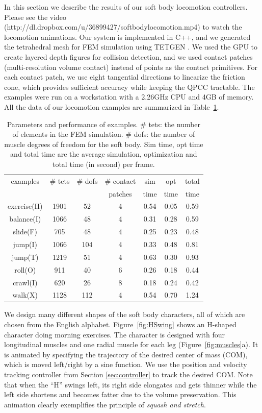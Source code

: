 In this section we describe the results of our soft body locomotion
controllers. Please see the video (http://dl.dropbox.com/u/36899427/softbodylocomotion.mp4) to watch the locomotion
animations. Our system is implemented in C++, and we generated the
tetrahedral mesh for FEM simulation using TETGEN \cite{Si:2006}. We
used the GPU to create layered depth figures for collision detection,
and we used contact patches (multi-resolution volume contact)
\cite{Allard:2010} instead of points as the contact primitives. For
each contact patch, we use eight tangential directions to linearize
the friction cone, which provides sufficient accuracy while keeping the QPCC tractable. The examples were run on a workstation with a
2.26GHz CPU and 4GB of memory. All the data of our locomotion
examples are summarized in Table~\ref{table:data}.

\begin{table}[!b]
\centering
\begin{tabular}{|c|c|c|c|c|c|c|}
\hline
examples & \# tets & \# dofs  & \# contact     & sim  & opt & total\\
         & & & patches & time & time & time\\
 \hline
exercise(H) & 1901 & 52  & 4 & 0.54 & 0.05 & 0.59\\
balance(I)  & 1066 & 48  & 4 & 0.31 & 0.28 & 0.59\\
slide(F)    & 705  & 48  & 4 & 0.25 & 0.23 & 0.48 \\
jump(I)     & 1066 & 104 & 4 & 0.33 & 0.48 & 0.81 \\
jump(T)     & 1219 & 51  & 4 & 0.63 & 0.30 & 0.93 \\
roll(O)     & 911  & 40  & 6 & 0.26 & 0.18 & 0.44\\
crawl(I)    & 620  & 26  & 8 & 0.18 & 0.24 & 0.42\\
walk(X)     & 1128 & 112 & 4 & 0.54 & 0.70 & 1.24\\

\hline
 \end{tabular}
 \caption{Parameters and performance of examples. \# tets: the number of
  elements in the FEM simulation. \# dofs: the number of muscle degrees of
  freedom for the soft body. Sim time, opt time and total time are the average simulation,
  optimization and total time (in second) per frame.}
 \label{table:data}
 \end{table}

We design many different shapes of the soft body characters, all of
which are chosen from the English alphabet. Figure~\ref{fig:HSwing} shows
an H-shaped character doing morning exercises. The character is designed
with four longitudinal muscles and one radial muscle for each
leg (Figure~\ref{fig:muscles}a). It is animated by specifying the
trajectory of the desired center of mass (COM), which is moved left/right
by a sine function. We use the position and velocity tracking controller
from Section \ref{sec:controller} to track the desired COM. Note that when
the ``H'' swings left, its right side elongates and gets thinner while the
left side shortens and becomes fatter due to the volume preservation. This
animation clearly exemplifies the principle of \emph{squash and stretch}.

